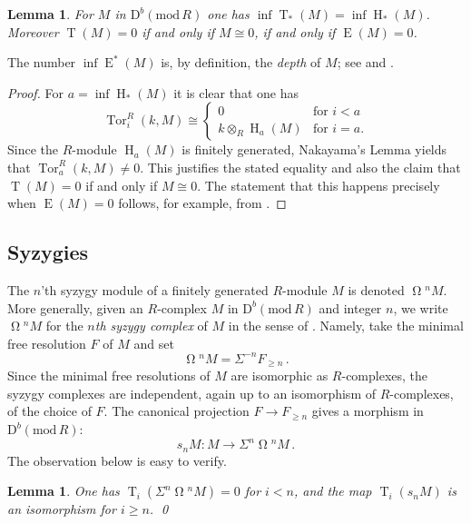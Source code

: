 \documentclass{amsart}
\numberwithin{equation}{section}
\theoremstyle{plain}
\newtheorem{lemma}[equation]{Lemma}
\theoremstyle{definition}
\theoremstyle{remark}
\newcommand{\dbcat}[1]{\mathrm{D}^b(\mathrm{mod}\,{#1})}
\newcommand{\eee}{\operatorname{E}}
\newcommand{\hh}{\operatorname{H}}
\newcommand{\syz}{\operatorname{\Omega}\!}
\newcommand{\tee}{\operatorname{T}}
\newcommand{\tor}{\operatorname{Tor}}
\begin{document}
\begin{lemma}
\label{le:inf}
For $M$ in $\dbcat R$ one has $\inf \tee_*(M)=\inf \hh_*(M)$. Moreover $\tee(M)=0$ if and only if $M\cong 0$, if and only if $\eee(M)=0$.
\end{lemma}

The number  $\inf \eee^*(M)$ is, by definition, the \emph{depth} of $M$; see \cite{Foxby:1979a} and \cite{Foxby/Iyengar:2003}.

\begin{proof}
For $a=\inf\hh_*(M)$ it is clear that one has
 \[
 \tor^R_i(k,M) \cong 
 \begin{cases}
     0& \text{for $i<a$} \\
     k\otimes_R\hh_a(M) & \text{for $i=a$.}
 \end{cases}
 \]
Since the $R$-module $\hh_a(M)$ is finitely generated, Nakayama's Lemma yields that $\tor^R_a(k,M)\ne 0$. This justifies the stated equality and also the claim that $\tee(M)=0$ if and only if $M\cong 0$.  The statement that this happens precisely when $\eee(M)=0$ follows, for example, from  \cite[Proposition~2.8]{Foxby:1979a}.
\end{proof}


\subsection*{Syzygies}
The $n$'th syzygy module of a finitely generated $R$-module $M$ is denoted $\syz^nM$. More generally, given an $R$-complex $M$ in $\dbcat R$ and integer $n$, we write $\syz^nM$ for the \emph{$n$th syzygy complex} of $M$ in the sense of \cite[Section~1]{Avramov/Iyengar:2007a}. Namely, take the minimal free resolution $F$ of $M$ and set
\[
\syz^nM = \Sigma^{-n}F_{\geqslant n}\,.
\]
Since the minimal free resolutions of $M$ are isomorphic as $R$-complexes, the syzygy complexes are independent, again up to an isomorphism of $R$-complexes, of the choice of $F$.  The canonical projection $F\to F_{\geqslant n}$ gives a morphism in $\dbcat R$:
\begin{equation}
    \label{eq:smap}
s_n M\colon M\longrightarrow \Sigma^n\syz^nM\,.
\end{equation}
The observation below is easy to verify.

\begin{lemma}
\label{le:tee-syz}
One has $\tee_i(\Sigma^n\syz^nM)=0$ for $i<n$, and the map $\tee_i(s_nM)$ is an isomorphism for $i\ge n$. \qed
\end{lemma}
\end{document}
